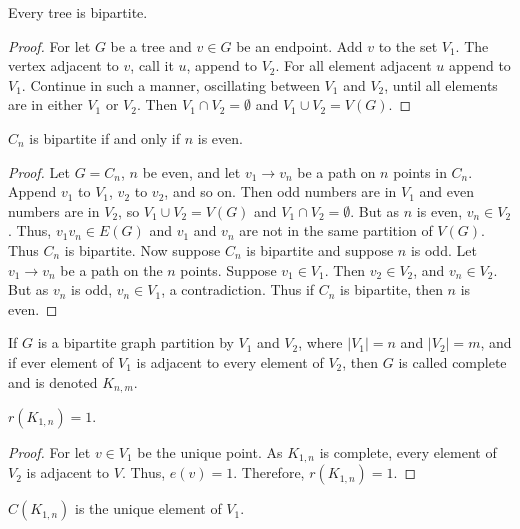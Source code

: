         \begin{theorem}
        Every tree is bipartite.
        \end{theorem}
        \begin{proof}
        For let $G$ be a tree and $v\in G$ be an endpoint. Add $v$ to the set $V_1$. The vertex adjacent to $v$, call it $u$, append to $V_2$. For all element adjacent $u$ append to $V_1$. Continue in such a manner, oscillating between $V_1$ and $V_2$, until all elements are in either $V_1$ or $V_2$. Then $V_1 \cap V_2 = \emptyset$ and $V_1 \cup V_2 = V(G)$.
        \end{proof}
        \begin{theorem}
        $C_n$ is bipartite if and only if $n$ is even. 
        \end{theorem}
        \begin{proof}
        Let $G=C_n$, $n$ be even, and let $v_1\rightarrow v_n$ be a path on $n$ points in $C_n$. Append $v_1$ to $V_1$, $v_2$ to $v_2$, and so on. Then odd numbers are in $V_1$ and even numbers are in $V_2$, so $V_1\cup V_2 = V(G)$ and $V_1 \cap V_2 = \emptyset$. But as $n$ is even, $v_n \in V_2$. Thus, $v_1 v_n \in E(G)$ and $v_1$ and $v_n$ are not in the same partition of $V(G)$. Thus $C_n$ is bipartite. Now suppose $C_n$ is bipartite and suppose $n$ is odd. Let $v_1 \rightarrow v_n$ be a path on the $n$ points. Suppose $v_1 \in V_1$. Then $v_2 \in V_2$, and $v_n \in V_2$. But as $v_n$ is odd, $v_{n} \in V_1$, a contradiction. Thus if $C_n$ is bipartite, then $n$ is even.
        \end{proof}
        \begin{definition}
        If $G$ is a bipartite graph partition by $V_1$ and $V_2$, where $|V_1| = n$ and $|V_2| = m$, and if ever element of $V_1$ is adjacent to every element of $V_2$, then $G$ is called complete and is denoted $K_{n,m}$.
        \end{definition}
        \begin{theorem}
        $r(K_{1,n}) = 1$.
        \end{theorem}
        \begin{proof}
        For let $v\in V_1$ be the unique point. As $K_{1,n}$ is complete, every element of $V_2$ is adjacent to $V$. Thus, $e(v) = 1$. Therefore, $r(K_{1,n}) =1$.
        \end{proof}
        \begin{theorem}
        $C(K_{1,n})$ is the unique element of $V_1$.
        \end{theorem}
